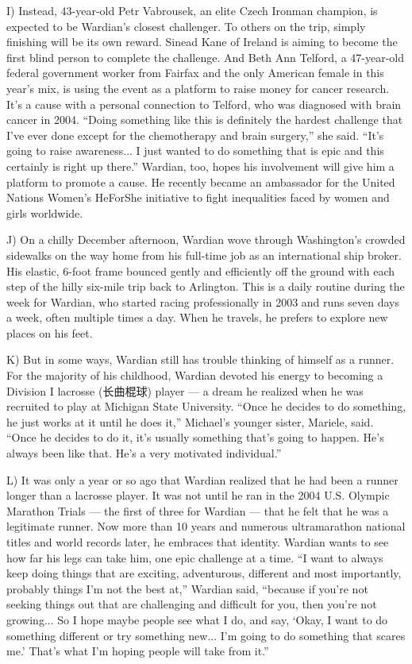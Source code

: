 \documentclass[UTF8,11pt]{ctexart}
\begin{document}
I) Instead, 43-year-old Petr Vabrousek, an elite Czech Ironman champion, is expected to be Wardian’s closest challenger. To others on the trip, simply finishing will be its own reward. Sinead Kane of Ireland is aiming to become the first blind person to complete the challenge. And Beth Ann Telford, a 47-year-old federal government worker from Fairfax and the only American female in this year’s mix, is using the event as a platform to raise money for cancer research. It’s a cause with a personal connection to Telford, who was diagnosed with brain cancer in 2004. “Doing something like this is definitely the hardest challenge that I’ve ever done except for the chemotherapy and brain surgery,” she said. “It’s going to raise awareness... I just wanted to do something that is epic and this certainly is right up there.” Wardian, too, hopes his involvement will give him a platform to promote a cause. He recently became an ambassador for the United Nations Women’s HeForShe initiative to fight inequalities faced by women and girls worldwide.


J) On a chilly December afternoon, Wardian wove through Washington’s crowded sidewalks on the way home from his full-time job as an international ship broker. His elastic, 6-foot frame bounced gently and efficiently off the ground with each step of the hilly six-mile trip back to Arlington. This is a daily routine during the week for Wardian, who started racing professionally in 2003 and runs seven days a week, often multiple times a day. When he travels, he prefers to explore new places on his feet.


K) But in some ways, Wardian still has trouble thinking of himself as a runner. For the majority of his childhood, Wardian devoted his energy to becoming a Division I lacrosse (长曲棍球) player — a dream he realized when he was recruited to play at Michigan State University. “Once he decides to do something, he just works at it until he does it,” Michael’s younger sister, Mariele, said. “Once he decides to do it, it’s usually something that’s going to happen. He’s always been like that. He’s a very motivated individual.”


L) It was only a year or so ago that Wardian realized that he had been a runner longer than a lacrosse player. It was not until he ran in the 2004 U.S. Olympic Marathon Trials — the first of three for Wardian — that he felt that he was a legitimate runner. Now more than 10 years and numerous ultramarathon national titles and world records later, he embraces that identity. Wardian wants to see how far his legs can take him, one epic challenge at a time. “I want to always keep doing things that are exciting, adventurous, different and most importantly, probably things I’m not the best at,” Wardian said, “because if you’re not seeking things out that are challenging and difficult for you, then you’re not growing... So I hope maybe people see what I do, and say, ‘Okay, I want to do something different or try something new... I’m going to do something that scares me.’ That’s what I’m hoping people will take from it.”
\end{document}
